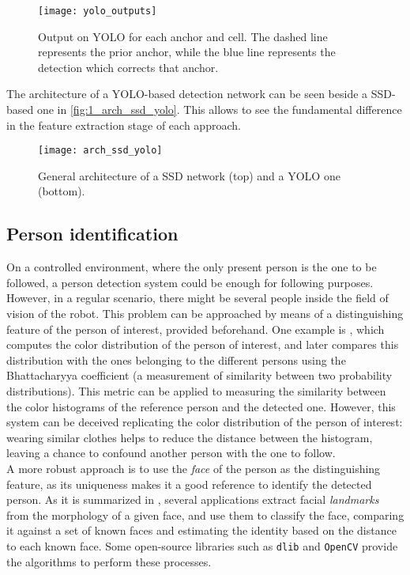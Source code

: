 \begin{figure}[h]
	\centering
	\texttt{[image: yolo\_outputs]}
	\caption{Output on YOLO for each anchor and cell. The dashed line represents the prior anchor, while the blue line represents the detection which corrects that anchor.}
	\label{fig:1_yolo_output}
\end{figure}


The architecture of a YOLO-based detection network can be seen beside a SSD-based one in \autoref{fig:1_arch_ssd_yolo}. This allows to see the fundamental difference in the feature extraction stage of each approach.

\begin{figure}[h]
	\centering
	\texttt{[image: arch\_ssd\_yolo]}
	\caption{General architecture of a SSD network (top) and a YOLO one (bottom).}
	\label{fig:1_arch_ssd_yolo}
\end{figure}


\subsection{Person identification}
On a controlled environment, where the only present person is the one to be followed, a person detection system could be enough for following purposes. However, in a regular scenario, there might be several people inside the field of vision of the robot. This problem can be approached by means of a distinguishing feature of the person of interest, provided beforehand. One example is \cite{color_id}, which computes the color distribution of the person of interest, and later compares this distribution with the ones belonging to the different persons using the Bhattacharyya coefficient \cite{bhattacharyya} (a measurement of similarity between two probability distributions). This metric can be applied to measuring the similarity between the color histograms of the reference person and the detected one. However, this system can be deceived replicating the color distribution of the person of interest: wearing similar clothes helps to reduce the distance between the histogram, leaving a chance to confound another person with the one to follow.\\

A more robust approach is to use the \textit{face} of the person as the distinguishing feature, as its uniqueness makes it a good reference to identify the detected person. As it is summarized in \cite{dlib_review}, several applications extract facial \textit{landmarks} from the morphology of a given face, and use them to classify the face, comparing it against a set of known faces and estimating the identity based on the distance to each known face. Some open-source libraries such as \texttt{dlib} and \texttt{OpenCV} provide the algorithms to perform these processes.\\

